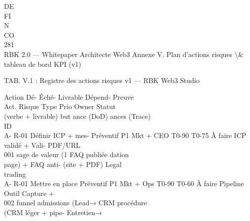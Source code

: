 \documentclass[12pt,landscape,a4paper]{article}
\begin{document}
\vspace{0.5em}
\vspace{0.5em}
\vspace{0.5em}
\vspace{0.5em}
DE\\
FI\\
N\\
CO\\
\vspace{0.5em}
\vspace{0.5em}
\vspace{0.5em}
\vspace{0.5em}
281\\
RBK 2.0 — Whitepaper Architecte Web3                                                                      Annexe V. Plan d’actions risques \textbackslash{}& tableau de bord KPI (v1)\\
\vspace{0.5em}
\vspace{0.5em}
\begin{center}\begin{tabular}TAB. V.1 : Registre des actions risques v1 — RBK Web3 Studio\end{tabular}\end{center}
Action                                         Dé-   Éché-           Livrable       Dépend- Preuve\\
Act. Risque                    Type      Prio Owner                    Statut\\
(verbe + livrable)                             but   ance            (DoD)          ances   (Trace)\\
ID\\
A- R-01     Définir ICP + mes- Préventif P1   Mkt + CEO    T0-90 T0-75 À faire   ICP validé +   Vali-      PDF/URL\\
001         sage de valeur (1                                                    FAQ publiée    dation\\
page) + FAQ anti-                                                    (site + PDF)   Legal\\
trading\\
A- R-01     Mettre en place    Préventif P1   Mkt + Ops    T0-90 T0-60 À faire   Pipeline      Outil   Capture +\\
002         funnel admissions                                                    (Lead→        CRM     procédure\\
(CRM léger + pipe-                                                   Entretien→\\
\end{document}
